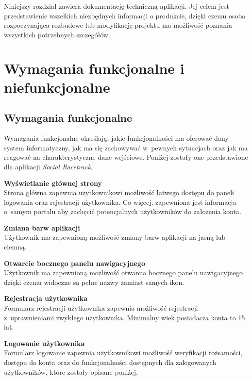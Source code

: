 \documentclass[../Kamil_Kowalewski_Main.tex]{subfiles}
\begin{document}
 {

    Niniejszy rozdział zawiera dokumentację techniczną aplikacji. Jej celem jest
    przedstawienie wszelkich niezbędnych informacji o produkcie, dzięki czemu osoba
    rozpoczynająca rozbudowe lub modyfikację projektu ma możliwość poznania wszystkich
    potrzebnych szczegółów.

    \section{Wymagania funkcjonalne i niefunkcjonalne}
    \label{chapter4:dok_techniczna:wymagania} {

        \subsection{Wymagania funkcjonalne}
        \label{chapter4:dok_techniczna:wymagania:funkc} {
            Wymagania funkcjonalne określają, jakie funkcjonalności ma oferować dany
            system informatyczny, jak ma się zachowywać w~pewnych sytuacjach oraz jak
            ma reagować na charakterystyczne dane wejściowe. Poniżej zostały one
            przedstawione dla aplikacji \textit{Social Racetrack}.

            \noindent\textbf{Wyświetlanie głównej strony}\\
            \indent Strona główna zapewnia użytkownikowi możliwość łatwego dostępu do
            paneli logowania oraz rejestracji użytkownika. Co więcej, zapewniona jest
            informacja o~samym portalu aby zachęcić potencjalnych użytkowników do
            założenia konta.

            \noindent\textbf{Zmiana barw aplikacji}\\
            \indent Użytkownik ma zapewnioną możliwość zmiany barw aplikacji na jasną
            lub ciemną.

            \noindent\textbf{Otwarcie bocznego panelu nawigacyjnego}\\
            \indent Użytkownik ma zapewnioną możliwość otwarcia bocznego panelu
            nawigacyjnego dzięki czemu widoczne są pełne nazwy zamiast samych ikon.

            \noindent\textbf{Rejestracja użytkownika}\\
            \indent Formularz rejestracji użytkownika zapewnia możliwość rejestracji
            z~uprawnieniami zwykłego użytkownika. Minimalny wiek posiadacza konta to 15 lat.

            \noindent\textbf{Logowanie użytkownika}\\
            \indent Formularz logowanie zapewnia użytkownikowi możliwość weryfikacji
            tożsamości, dostępu do konta oraz do funkcjonalności dostępnych dla
            zalogowanych użytkowników, które zostały opisane poniżej.

}}}
\end{document}
